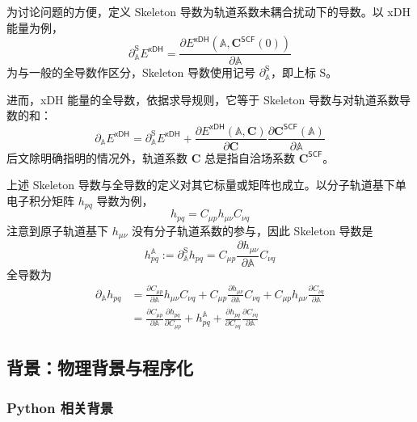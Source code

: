 为讨论问题的方便，定义 Skeleton 导数为轨道系数未耦合扰动下的导数。以 xDH 能量为例，
\begin{equation}
  \partial_\mathbb{A}^\mathrm{S} E^\textsf{xDH} = \frac{\partial E^\textsf{xDH} (\mathbb{A}, \mathbf{C}^\textsf{SCF} (0))}{\partial \mathbb{A}}
\end{equation}
为与一般的全导数作区分，Skeleton 导数使用记号 $\partial_\mathbb{A}^\mathrm{S}$，即上标 $\mathrm{S}$。

进而，xDH 能量的全导数，依据求导规则，它等于 Skeleton 导数与对轨道系数导数的和：
\begin{equation}
  \partial_\mathbb{A} E^\textsf{xDH} = \partial_\mathbb{A}^\mathrm{S} E^\textsf{xDH} + \frac{\partial E^\textsf{xDH} (\mathbb{A}, \mathbf{C})}{\partial \mathbf{C}} \frac{\partial \mathbf{C}^\textsf{SCF} (\mathbb{A})}{\partial \mathbb{A}}
\end{equation}
后文除明确指明的情况外，轨道系数 $\mathbf{C}$ 总是指自洽场系数 $\mathbf{C}^\textsf{SCF}$。

上述 Skeleton 导数与全导数的定义对其它标量或矩阵也成立。以分子轨道基下单电子积分矩阵 $h_{pq}$ 导数为例，
\begin{equation*}
  h_{pq} = C_{\mu p} h_{\mu \nu} C_{\nu q}
\end{equation*}
注意到原子轨道基下 $h_{\mu \nu}$ 没有分子轨道系数的参与，因此 Skeleton 导数是
\begin{equation*}
  h_{pq}^\mathbb{A} := \partial_\mathbb{A}^\mathrm{S} h_{pq} = C_{\mu p} \frac{\partial h_{\mu \nu}}{\partial \mathbb{A}} C_{\nu q}
\end{equation*}
全导数为
\begin{align*}
  \partial_\mathbb{A} h_{pq}
  &= \frac{\partial C_{\mu p}}{\partial \mathbb{A}} h_{\mu \nu} C_{\nu q} + C_{\mu p} \frac{\partial h_{\mu \nu}}{\partial \mathbb{A}} C_{\nu q} + C_{\mu p} h_{\mu \nu} \frac{\partial C_{\nu q}}{\partial \mathbb{A}} \\
  &= \frac{\partial C_{\mu p}}{\partial \mathbb{A}} \frac{\partial h_{pq}}{\partial C_{\mu p}} + h_{pq}^\mathbb{A} + \frac{\partial h_{pq}}{\partial C_{\nu q}} \frac{\partial C_{\nu q}}{\partial \mathbb{A}}
\end{align*}


\subsection{背景：物理背景与程序化}
\label{sec.3.background}

\subsubsection{Python 相关背景}

